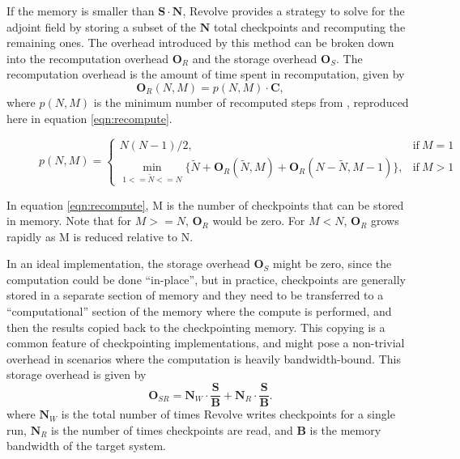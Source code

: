 \documentclass[conference]{IEEEtran}
\begin{document}
If the memory is smaller than $\mathbf{S} \cdot \mathbf{N}$, Revolve provides
a strategy to solve for the adjoint field by storing a subset of the $\mathbf{N}$ total checkpoints
and recomputing the remaining ones. The overhead introduced by this method can be broken down into
the recomputation overhead $\mathbf{O}_R$ and the storage overhead $\mathbf{O}_S$. The recomputation
overhead is the amount of time spent in recomputation, given by
\begin{equation}
\mathbf{O}_R(N, M) = p(N, M) \cdot \mathbf{C},
\end{equation}
where $p(N, M)$ is the minimum number of recomputed steps from \cite{griewank2000algorithm}, reproduced
here in equation \ref{eqn:recompute}.
\begin{figure}
\begin{equation}
p(N, M) = \begin{cases}
      N(N-1) /2, & \text{if}\ M=1 \\
      \min\limits_{1<=\widetilde{N}<=N} \{\widetilde{N} + \mathbf{O}_R(\widetilde{N}, M) + \mathbf{O}_R(N-\widetilde{N}, M-1)\}, & \text{if}\ M>1
    \end{cases}
    \label{eqn:recompute}
\end{equation}
\end{figure}
In equation \ref{eqn:recompute}, M is the number of checkpoints that can be
stored in memory. Note that for $M >=N$, $\mathbf{O}_R$ would be zero. For $M <
N$, $\mathbf{O}_R$ grows rapidly as M is reduced relative to N. 

In an ideal implementation, the storage overhead $\mathbf{O}_S$ might be zero, since the computation could
be done ``in-place'', but in practice, checkpoints are generally stored in a separate section of memory and they
need to be transferred to a ``computational'' section of the memory where the compute is performed, and then
the results copied back to the checkpointing memory. This copying is a common feature of checkpointing
implementations, and might pose a non-trivial overhead in scenarios where the computation is heavily bandwidth-bound. 
This storage overhead is given by
\begin{equation}
\mathbf{O}_{SR} = \mathbf{N}_W \cdot \frac{\mathbf{S}}{\mathbf{B}} +
\mathbf{N}_R \cdot \frac{\mathbf{S}}{\mathbf{B}}.
\label{eqn:storage}
\end{equation}
where $\mathbf{N}_W$ is the total number of times Revolve writes checkpoints for a single run, $ \mathbf{N}_R$ 
is the number of times checkpoints are read, and $\mathbf{B}$ is the memory bandwidth of the target system. 
\end{document}
